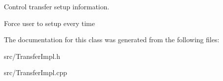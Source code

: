 Control transfer setup information. 

Force user to setup every time 

The documentation for this class was generated from the following files\-:\begin{DoxyCompactItemize}
\item 
src/Transfer\-Impl.\-h\item 
src/Transfer\-Impl.\-cpp\end{DoxyCompactItemize}
